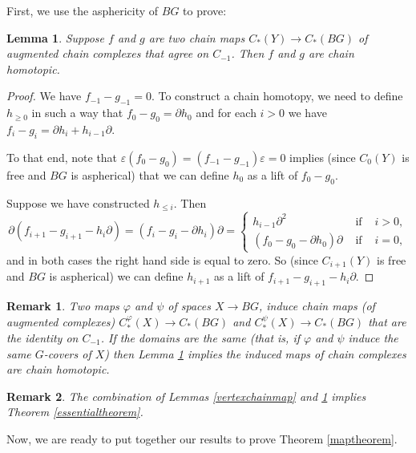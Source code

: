 \documentclass[11pt,letterpaper]{amsart}
\newtheorem{lemma}[theorem]{Lemma}
\newtheorem*{remark}{Remark}
\begin{document}
First, we use the asphericity of $BG$ to prove: 
\begin{lemma}
\label{chainhomotopiclemma}
Suppose $f$ and $g$ are two chain maps $C_*(Y)\rightarrow C_*(BG)$ of augmented chain complexes that agree on $C_{-1}$. Then $f$ and $g$ are chain homotopic. 
\end{lemma}
\begin{proof}
We have $f_{-1}-g_{-1}=0$. To construct a chain homotopy, we need to define $h_{\geq 0}$ in such a way that $f_0-g_0=\partial h_0$ and for each $i>0$ we have $f_i-g_i=\partial h_i+h_{i-1}\partial$. 

To that end, note that $\varepsilon(f_0-g_0)=(f_{-1}-g_{-1})\varepsilon=0$ implies (since $C_0(Y)$ is free and $BG$ is aspherical) that we can define $h_0$ as a lift of $f_0-g_0$.

Suppose we have constructed $h_{\leq i}$. %
Then 
$$
\partial(f_{i+1}-g_{i+1}-h_i\partial)=(f_i-g_i-\partial h_i)\partial=\left\{\begin{array}{ccc}h_{i-1}\partial^2&\mbox{ if }&i>0,\\(f_0-g_0-\partial h_0)\partial &\mbox{ if }& i=0, 
\end{array}\right.
$$
and in both cases the right hand side is equal to zero. 
So (since $C_{i+1}(Y)$ is free and $BG$ is aspherical) we can define $h_{i+1}$ as a lift of $f_{i+1}-g_{i+1}-h_i\partial$.
\end{proof}
\begin{remark}%
Two maps $\varphi$ and $\psi$ of spaces $X\rightarrow BG$, induce chain maps (of augmented complexes) $C_*^{\varphi}(X)\rightarrow C_*(BG)$ and $C_*^{\psi}(X)\rightarrow C_*(BG)$ that are the identity on $C_{-1}$. If the domains are the same (that is, if $\varphi$ and $\psi$ induce the same $G$-covers of $X$) then Lemma \ref{chainhomotopiclemma} implies the induced maps of chain complexes are chain homotopic. 
\end{remark}
\begin{remark}
The combination of Lemmas \ref{vertexchainmap} and \ref{chainhomotopiclemma} implies Theorem \ref{essentialtheorem}.
\end{remark}

Now, we are ready to put together our results to prove Theorem \ref{maptheorem}.
\end{document}
